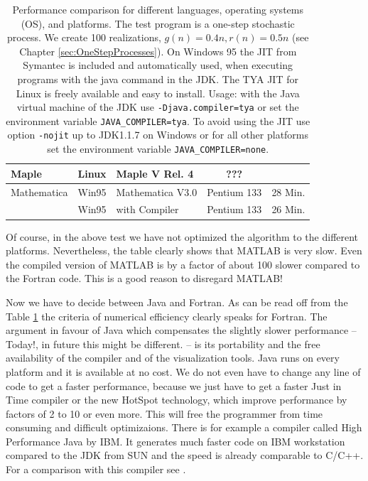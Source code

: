 \begin{table}[htbp]
\begin{center}
\begin{tabular}{llp{3cm}|c|c}
   Maple   & Linux & Maple V Rel. 4 & ??? & \\\hline
Mathematica& Win95 & Mathematica V3.0 & Pentium 133 & 28 Min. \\
\rowcolor{tabgray} & Win95 & with Compiler    & Pentium 133 & 26 Min. \\ \hline
    \end{tabular}
    \caption[Performance Table.]%
    {Performance comparison for different languages, operating
      systems (OS), and platforms.
      The test program is a one-step stochastic process. We create 100
      realizations, $g(n)=0.4n, r(n)=0.5n$ (see Chapter 
      \ref{sec:OneStepProcesses}).
      On Windows 95 the JIT from
      Symantec is included and automatically used, when executing programs
      with the java command in the JDK. The TYA JIT for Linux is freely
      available and easy to install. Usage: with the Java virtual machine of
      the JDK use \texttt{-Djava.compiler=tya} or 
      set the environment variable \texttt{JAVA\_COMPILER=tya}. To avoid
      using the JIT use option \texttt{-nojit} up to JDK1.1.7 on Windows or
      for all other platforms set the environment variable 
      \texttt{JAVA\_COMPILER=none}.
      }
    \label{tab:Performance}
  \end{center}
\end{table}


Of course, in the above test we have not optimized the algorithm to the 
different platforms. Nevertheless, the table clearly shows that MATLAB is 
very slow. Even the compiled version of MATLAB is by a factor of 
about 100 slower
compared to the Fortran code. This is a good reason to disregard MATLAB!

Now we have to decide between Java and Fortran. As can be read off from
the Table \ref{tab:Performance} the criteria of numerical efficiency
clearly speaks for Fortran. The argument in favour of 
Java which compensates the slightly slower performance -- Today!, in future 
this might be different. -- is its portability and the free availability of the
compiler and of the visualization tools. Java runs on every platform and 
it is available at no cost. We do not even have to change any line
of code to get a faster performance, because we just have to get a faster
Just in Time compiler or the new HotSpot technology, which improve
performance by factors of 2 to 10 or even more. This will free the
programmer from time consuming and difficult optimizaions. 
There is for example a compiler called High Performance Java by IBM. It generates
much faster code on IBM workstation compared to the JDK from SUN and the 
speed is already comparable to C/C++. 
For a comparison with this compiler see \cite[]{HPJ}.

